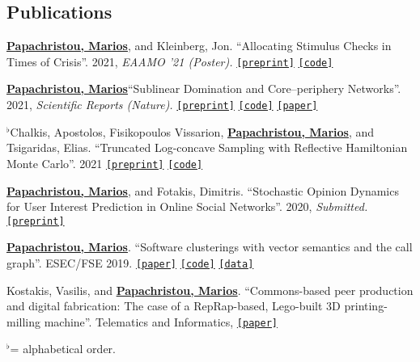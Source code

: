 \documentclass[margin, 10pt]{res}
\newcommand{\alphabeticalorder}[0]{\ensuremath  {^\flat}}
\newcommand{\specialurl}[2]{\href { #2 } {\nolinkurl{[#1]}}}
\newcommand{\preprint}[1]{\specialurl {preprint} {#1}}
\newcommand{\code}[1]{\specialurl {code} {#1}}
\newcommand{\data}[1]{\specialurl {data} {#1}}
\newcommand{\paper}[1]{\specialurl {paper} {#1}}
\newcommand{\authorref}[1]{\underline {\textbf{#1}}}
\newcommand{\authorme}{\authorref{Papachristou, Marios}}
\begin{document}
\begin{resume}
\section{Publications}

\begin{compactenum}
    
   \item  \authorme, and Kleinberg, Jon. ``Allocating Stimulus Checks in Times of Crisis''. 2021, \emph{EAAMO '21 (Poster).} \preprint{https://arxiv.org/abs/2106.07560} \code{https://github.com/papachristoumarios/financial-contagion}     
   \item \authorme ``Sublinear Domination and Core--periphery Networks''. 2021,  \emph{Scientific Reports (Nature).}  \preprint{https://arxiv.org/abs/2103.03135} \code{https://bit.ly/3wKNGI0} \paper{http://www.nature.com/articles/s41598-021-94105-8}
    \item \alphabeticalorder Chalkis, Apostolos, Fisikopoulos Vissarion, \authorme, and Tsigaridas, Elias. ``Truncated Log-concave Sampling with Reflective Hamiltonian Monte Carlo''. 2021 \preprint{https://arxiv.org/abs/2102.13068} \code{https://github.com/GeomScale/volume_approximation}
    \item \authorme, and Fotakis, Dimitris. ``Stochastic Opinion Dynamics for User Interest Prediction in Online Social Networks''. 2020, \emph{Submitted.}  \preprint{https://www.researchgate.net/publication/353006940_Stochastic_Opinion_Dynamics_for_Interest_Prediction_in_Social_Networks}
    \item \authorme. ``Software clusterings with vector semantics and the call graph''. ESEC/FSE 2019.  \paper{https://dl.acm.org/citation.cfm?id=3342483} \code{https://github.com/papachristoumarios/sade} \data{http://doi.org/10.5281/zenodo.2652487}
    \item Kostakis, Vasilis, and \authorme. ``Commons-based peer production and digital fabrication: The case of a RepRap-based, Lego-built 3D printing-milling machine''. Telematics and Informatics,  \paper{https://bit.ly/2JRoisV} 
    
\end{compactenum}

\alphabeticalorder  = alphabetical order.


\end{resume}
\end{document}

